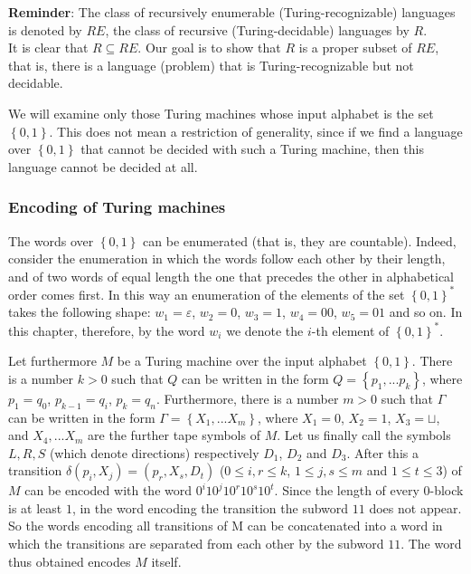 \documentclass[margin=0px]{article}
\begin{document}
\noindent \textbf{Reminder}: The class of recursively enumerable (Turing-recognizable) languages is denoted by $RE$,
the class of recursive (Turing-decidable) languages by $R$.\\

It is clear that $R \subseteq RE $. Our goal is to show that $R$ is a proper subset of $RE$,
that is, there is a language (problem) that is Turing-recognizable but not decidable.

We will examine only those Turing machines whose input alphabet is the set $\left\{0, 1\right\}$.
This does not mean a restriction of generality, since if we find a language over $\left\{0, 1\right\}$
that cannot be decided with such a Turing machine, then this language cannot be decided at all.\\

\subsubsection{Encoding of Turing machines}

The words over $\left\{0, 1\right\}$ can be enumerated (that is, they are countable). Indeed, consider the enumeration
in which the words follow each other by their length, and of two words of equal length the one that
precedes the other in alphabetical order comes first. In this way
an enumeration of the elements of the set $\left\{0, 1\right\}^{*}$ takes the following shape: $w_{1} = \varepsilon$,
$w_{2} = 0$, $w_{3} = 1$, $w_{4} = 00$, $w_{5} = 01$ and so on. In this chapter, therefore, by the word
$w_{i}$ we denote the $i$-th element of $\left\{0, 1\right\}^{*}$.

Let furthermore $M$ be a Turing machine over the input alphabet $\left\{0, 1\right\}$. There is a number $k > 0$ such that
$Q$ can be written in the form $Q = \left\{p_{1}, ... p_{k}\right\}$, where $p_{1} = q_{0}$, $p_{k-1} = q_{i}$, $p_{k} = q_{n}$.
Furthermore, there is a number $m > 0$ such that $\Gamma$ can be written in the form $\Gamma = \left\{X_{1}, ... X_{m}\right\}$,
where $X_{1} = 0$, $X_{2} = 1$, $X_{3} = \sqcup$, and $X_{4}, ... X_{m}$ are the further tape symbols of $M$.
Let us finally call the symbols $L, R, S$ (which denote directions) respectively $D_{1}$, $D_{2}$ and $D_{3}$.
After this a transition $\delta(p_{i},X_{j}) = (p_{r}, X_{s}, D_{t})$ ($0 \leq i,r \leq k$, $1 \leq j,s \leq m$ and $1 \leq t \leq 3$)
of $M$ can be encoded with the word $0^{i}10^{j}10^{r}10^{s}10^{t}$. Since the length of every $0$-block is at least $1$, in the word
encoding the transition the subword $11$ does not appear. So the words encoding all transitions of M can be concatenated into a word
in which the transitions are separated from each other by the subword $11$. The word thus obtained encodes $M$ itself.\\
\end{document}
